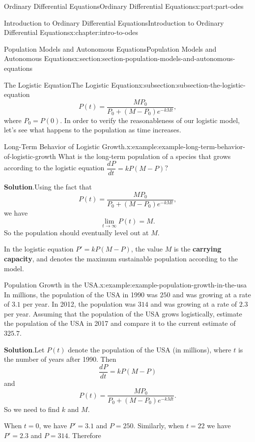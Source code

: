 \documentclass[twoside,10pt,]{book}
\newcommand{\blocktitlefont}{\relax}
\newcommand{\terminology}[1]{\textbf{#1}}
\numberwithin{equation}{part}
\providecommand{\dv}[3][]{\dfrac{d^{#1} #2}{d #3^{#1}}}
\begin{document}
\begin{partptx}{Ordinary Differential Equations}{}{Ordinary Differential Equations}{}{}{x:part:part-odes}
\begin{chapterptx}{Introduction to Ordinary Differential Equations}{}{Introduction to Ordinary Differential Equations}{}{}{x:chapter:intro-to-odes}
\begin{sectionptx}{Population Models and Autonomous Equations}{}{Population Models and Autonomous Equations}{}{}{x:section:section-population-models-and-autonomous-equations}
\begin{subsectionptx}{The Logistic Equation}{}{The Logistic Equation}{}{}{x:subsection:subsection-the-logistic-equation}
\begin{equation*}
P(t) = \frac{MP_{0}}{P_{0} + (M - P_{0})e^{-kMt}},
\end{equation*}
where \(P_{0} = P(0)\). In order to verify the reasonableness of our logistic model, let's see what happens to the population as time increases.%
\begin{example}{Long-Term Behavior of Logistic Growth.}{x:example:example-long-term-behavior-of-logistic-growth}%
What is the long-term population of a species that grows according to the logistic equation \(\dv{P}{t} = kP(M-P)\)?%
\par\smallskip%
\noindent\textbf{\blocktitlefont Solution}.\hypertarget{g:solution:idp105548816477088}{}\quad{}Using the fact that%
\begin{equation*}
P(t) = \frac{MP_{0}}{P_{0} + (M - P_{0})e^{-kMt}},
\end{equation*}
we have%
\begin{equation*}
\lim_{t\to\infty}P(t) = M.
\end{equation*}
So the population should eventually level out at \(M\).%
\end{example}
In the logistic equation \(P' = kP(M-P)\), the value \(M\) is the \terminology{carrying capacity}, and denotes the maximum sustainable population according to the model.%
\begin{example}{Population Growth in the USA.}{x:example:example-population-growth-in-the-usa}%
In millions, the population of the USA in 1990 was \(250\) and was growing at a rate of \(3.1\) per year. In 2012, the population was \(314\) and was growing at a rate of \(2.3\) per year. Assuming that the population of the USA grows logistically, estimate the population of the USA in 2017 and compare it to the current estimate of \(325.7\).%
\par\smallskip%
\noindent\textbf{\blocktitlefont Solution}.\hypertarget{g:solution:idp105548816482848}{}\quad{}Let \(P(t)\) denote the population of the USA (in millions), where \(t\) is the number of years after 1990. Then%
\begin{equation*}
\dv{P}{t} = kP(M-P)
\end{equation*}
and%
\begin{equation*}
P(t) = \frac{MP_{0}}{P_{0} + (M - P_{0})e^{-kMt}}.
\end{equation*}
So we need to find \(k\) and \(M\).%
\par
When \(t = 0\), we have \(P' = 3.1\) and \(P = 250\). Similarly, when \(t = 22\) we have \(P' = 2.3\) and \(P = 314\). Therefore%

\end{example}
\end{subsectionptx}
\end{sectionptx}
\end{chapterptx}
\end{partptx}
\end{document}
